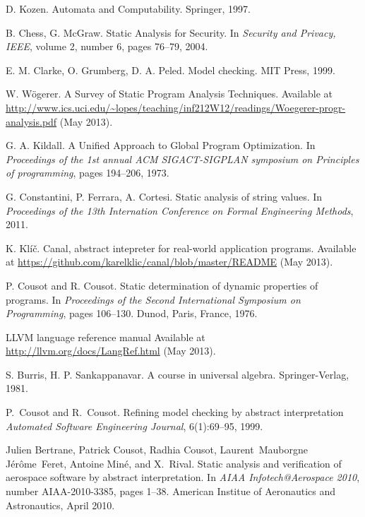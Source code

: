 \documentclass[12pt,final,oneside]{fithesis2}
\theoremstyle{definition}
\begin{document}
\begin{thebibliography}{99}
D{.} Kozen.
\newblock Automata and Computability.
\newblock Springer, 1997.

B{.} Chess, G{.} McGraw.
\newblock Static Analysis for Security.
\newblock In \emph{Security and Privacy, IEEE}, volume 2, number 6,
  pages 76--79, 2004.

E{.} M{.} Clarke, O{.} Grumberg, D{.} A{.} Peled.
\newblock Model checking.
\newblock MIT Press, 1999.

W{.} W\"{o}gerer.
\newblock A Survey of Static Program Analysis Techniques.
\newblock Available at \url{http://www.ics.uci.edu/~lopes/teaching/inf212W12/readings/Woegerer-progr-analysis.pdf}
  (May 2013).

G{.} A{.} Kildall.
\newblock A Unified Approach to Global Program Optimization.
\newblock In \emph{Proceedings of the 1st annual ACM SIGACT-SIGPLAN
  symposium on Principles of programming}, pages 194--206, 1973.

G{.} Constantini, P{.} Ferrara, A{.} Cortesi.
\newblock Static analysis of string values.
\newblock In \emph{Proceedings of the 13th Internation Conference on Formal
  Engineering Methods}, 2011.

K{.} Klíč.
\newblock Canal, abstract intepreter for real-world application programs.
\newblock Available at \url{https://github.com/karelklic/canal/blob/master/README}
  (May 2013).

P{.} Cousot and R{.} Cousot.
\newblock Static determination of dynamic properties of programs.
\newblock In {\em Proceedings of the Second International Symposium on
  Programming}, pages 106--130. Dunod, Paris, France, 1976.

\newblock LLVM language reference manual
\newblock Available at \url{http://llvm.org/docs/LangRef.html} (May 2013).

S{.} Burris, H{.} P{.} Sankappanavar.
\newblock A course in universal algebra.
\newblock Springer-Verlag, 1981.

P.~Cousot and R.~Cousot.
\newblock Refining model checking by abstract interpretation
\newblock \emph{Automated Software Engineering Journal}, 6(1):69--95, 1999.

Julien Bertrane, Patrick Cousot, Radhia Cousot, Laurent~Mauborgne
  J{\'e}r{\^o}me~Feret, Antoine Min{\'e}, and X.~Rival.
\newblock Static analysis and verification of aerospace software by abstract
  interpretation.
\newblock In {\em AIAA Infotech@Aerospace 2010}, number AIAA-2010-3385, pages
  1--38. American Institue of Aeronautics and Astronautics, April 2010.


\end{thebibliography}
\end{document}
